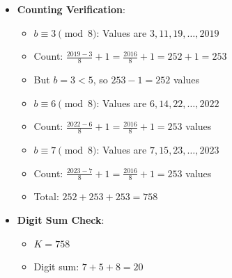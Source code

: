 \documentclass[11pt]{article}
\begin{document}
\begin{verificationbox}
\begin{itemize}[leftmargin=*]
    \item \textbf{Counting Verification}:
    \begin{itemize}
        \item $b \equiv 3 \pmod{8}$: Values are $3, 11, 19, \ldots, 2019$
        \item Count: $\frac{2019 - 3}{8} + 1 = \frac{2016}{8} + 1 = 252 + 1 = 253$
        \item But $b = 3 < 5$, so $253 - 1 = 252$ values
        \item $b \equiv 6 \pmod{8}$: Values are $6, 14, 22, \ldots, 2022$
        \item Count: $\frac{2022 - 6}{8} + 1 = \frac{2016}{8} + 1 = 253$ values
        \item $b \equiv 7 \pmod{8}$: Values are $7, 15, 23, \ldots, 2023$
        \item Count: $\frac{2023 - 7}{8} + 1 = \frac{2016}{8} + 1 = 253$ values
        \item Total: $252 + 253 + 253 = 758$
    \end{itemize}
    
    \item \textbf{Digit Sum Check}:
    \begin{itemize}
        \item $K = 758$
        \item Digit sum: $7 + 5 + 8 = 20$ \checkmark
    \end{itemize}
\end{itemize}


\end{verificationbox}
\end{document}
